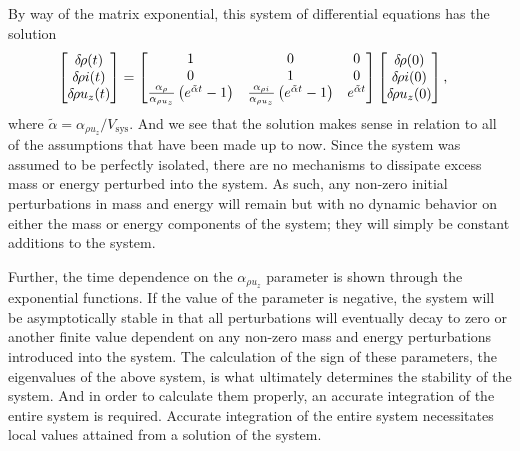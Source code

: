 By way of the matrix exponential, this system of differential equations has the solution
\begin{align}
    \begin{bmatrix}
        \delta\mkern-2mu\rho(t) \\ \delta\mkern-2mu\rho i(t) \\ \delta\mkern-2mu\rho u_z(t) 
    \end{bmatrix}
     &= 
    \begin{bmatrix}
        1 & 0 & 0 \\
        0 & 1 & 0 \\
        \frac{\alpha_\rho}{\alpha_{\rho u_z}}     \left(e^{\tilde{\alpha} t} - 1 \right) &
        \frac{\alpha_{\rho i}}{\alpha_{\rho u_z}} \left(e^{\tilde{\alpha} t} - 1 \right) &
        e^{\tilde{\alpha} t}
    \end{bmatrix}
    \begin{bmatrix}
        \delta\mkern-2mu\rho(0)\\ \delta\mkern-2mu\rho i(0) \\ \delta\mkern-2mu\rho u_z(0) 
    \end{bmatrix},
\end{align}
where $\tilde{\alpha} = \alpha_{\rho u_z} / V_{\text{sys}}$.
And we see that the solution makes sense in relation to all of the assumptions that have been made up to now.
Since the system was assumed to be perfectly isolated, there are no mechanisms to dissipate excess mass or energy perturbed into the system.
As such, any non-zero initial perturbations in mass and energy will remain but with no dynamic behavior on either the mass or energy components of the system; they will simply be constant additions to the system.

Further, the time dependence on the $\alpha_{\rho u_z}$ parameter is shown through the exponential functions.  If the value of the parameter is negative, the system will be asymptotically stable in that all perturbations will eventually decay to zero or another finite value dependent on any non-zero mass and energy perturbations introduced into the system.
The calculation of the sign of these parameters, the eigenvalues of the above system, is what ultimately determines the stability of the system.
And in order to calculate them properly, an accurate integration of the entire system is required.
Accurate integration of the entire system necessitates local values attained from a  solution of the system.



